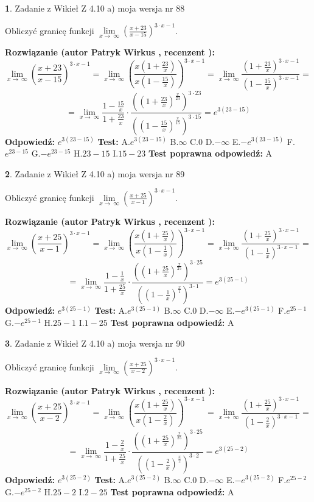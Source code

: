 \documentclass[12pt, a4paper]{article}
\theoremstyle{definition} %
\newtheorem{zad}{}
\newcommand{\zadStart}[1]{\begin{zad}#1\newline}
\newcommand{\zadStop}{\end{zad}}
\newcommand{\rozwStart}[2]{\noindent \textbf{Rozwiązanie (autor #1 , recenzent #2): }\newline}
\newcommand{\rozwStop}{\newline}
\newcommand{\odpStart}{\noindent \textbf{Odpowiedź:}\newline}
\newcommand{\odpStop}{\newline}
\newcommand{\testStart}{\noindent \textbf{Test:}\newline}
\newcommand{\testStop}{\newline}
\newcommand{\kluczStart}{\noindent \textbf{Test poprawna odpowiedź:}\newline}
\newcommand{\kluczStop}{\newline}
\begin{document}
\zadStart{Zadanie z Wikieł Z 4.10 a) moja wersja nr 88}


Obliczyć granicę funkcji  $\lim\limits_{x\to\ \infty}(\frac{x+23}{x-15})^{3\cdot x-1}$.
\zadStop
\rozwStart{Patryk Wirkus}{}
$$\lim\limits_{x\to\ \infty}(\frac{x+23}{x-15})^{3\cdot x-1} = \lim\limits_{x\to\ \infty}(\frac{x(1+\frac{23}{x})}{x(1-\frac{15}{x})})^{3\cdot x-1}=\lim\limits_{x\to\ \infty}\frac{(1+\frac{23}{x})^{3\cdot x-1}}{(1-\frac{15}{x})^{3\cdot x-1}}=$$
$$=\lim\limits_{x\to\ \infty}\frac{1-\frac{15}{x}}{1+\frac{23}{x}}\cdot\frac{((1+\frac{23}{x})^{\frac{x}{23}})^{3\cdot23}}{((1-\frac{15}{x})^{\frac{x}{15}})^{3\cdot15}}=e^{3(23-15)}$$
\rozwStop
\odpStart
$e^{3(23-15)}$
\odpStop
\testStart
A.$e^{3(23-15)}$ B.$\infty$ C.$0$ D.$-\infty$ E.$-e^{3(23-15)}$
F.$e^{23-15}$ G.$-e^{23-15}$
H.$23-15$
I.$15-23$
\testStop
\kluczStart
A
\kluczStop



\zadStart{Zadanie z Wikieł Z 4.10 a) moja wersja nr 89}


Obliczyć granicę funkcji  $\lim\limits_{x\to\ \infty}(\frac{x+25}{x-1})^{3\cdot x-1}$.
\zadStop
\rozwStart{Patryk Wirkus}{}
$$\lim\limits_{x\to\ \infty}(\frac{x+25}{x-1})^{3\cdot x-1} = \lim\limits_{x\to\ \infty}(\frac{x(1+\frac{25}{x})}{x(1-\frac{1}{x})})^{3\cdot x-1}=\lim\limits_{x\to\ \infty}\frac{(1+\frac{25}{x})^{3\cdot x-1}}{(1-\frac{1}{x})^{3\cdot x-1}}=$$
$$=\lim\limits_{x\to\ \infty}\frac{1-\frac{1}{x}}{1+\frac{25}{x}}\cdot\frac{((1+\frac{25}{x})^{\frac{x}{25}})^{3\cdot25}}{((1-\frac{1}{x})^{\frac{x}{1}})^{3\cdot1}}=e^{3(25-1)}$$
\rozwStop
\odpStart
$e^{3(25-1)}$
\odpStop
\testStart
A.$e^{3(25-1)}$ B.$\infty$ C.$0$ D.$-\infty$ E.$-e^{3(25-1)}$
F.$e^{25-1}$ G.$-e^{25-1}$
H.$25-1$
I.$1-25$
\testStop
\kluczStart
A
\kluczStop



\zadStart{Zadanie z Wikieł Z 4.10 a) moja wersja nr 90}


Obliczyć granicę funkcji  $\lim\limits_{x\to\ \infty}(\frac{x+25}{x-2})^{3\cdot x-1}$.
\zadStop
\rozwStart{Patryk Wirkus}{}
$$\lim\limits_{x\to\ \infty}(\frac{x+25}{x-2})^{3\cdot x-1} = \lim\limits_{x\to\ \infty}(\frac{x(1+\frac{25}{x})}{x(1-\frac{2}{x})})^{3\cdot x-1}=\lim\limits_{x\to\ \infty}\frac{(1+\frac{25}{x})^{3\cdot x-1}}{(1-\frac{2}{x})^{3\cdot x-1}}=$$
$$=\lim\limits_{x\to\ \infty}\frac{1-\frac{2}{x}}{1+\frac{25}{x}}\cdot\frac{((1+\frac{25}{x})^{\frac{x}{25}})^{3\cdot25}}{((1-\frac{2}{x})^{\frac{x}{2}})^{3\cdot2}}=e^{3(25-2)}$$
\rozwStop
\odpStart
$e^{3(25-2)}$
\odpStop
\testStart
A.$e^{3(25-2)}$ B.$\infty$ C.$0$ D.$-\infty$ E.$-e^{3(25-2)}$
F.$e^{25-2}$ G.$-e^{25-2}$
H.$25-2$
I.$2-25$
\testStop
\kluczStart
A
\kluczStop
\end{document}
